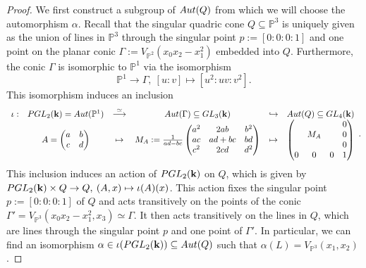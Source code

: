 \documentclass[10pt,a4paper]{amsart}
\newcommand{\Aut}{\textup{Aut}}
\newcommand{\GL}{\textup{GL}}
\newcommand{\PGL}{\textup{PGL}}
\newcommand{\Pone}{\mathbb{P}^1}
\newcommand{\Pthree}{\mathbb{P}^3}
\newcommand{\Ptwo}{\mathbb{P}^2}
\newcommand{\VPthree}{V_{\Pthree}}
\newcommand{\VPtwo}{V_{\Ptwo}}
\newcommand{\kk}{\mathbf{k}}
\newcommand{\sub}{\subseteq}
\begin{document}
\begin{proof}
We first construct a subgroup of $\Aut(Q)$ from which we will choose the automorphism $\alpha$. Recall that the singular quadric cone $Q\sub\Pthree$ is uniquely given as the union of lines in $\Pthree$ through the singular point $p:=[0:0:0:1]$ and one point on the planar conic $\Gamma:=\VPtwo(x_0x_2-x_1^2)$ embedded into $Q$. Furthermore, the conic $\Gamma$ is isomorphic to $\Pone$ via the isomorphism 
$$ \Pone \rightarrow \Gamma, \: [u:v]\mapsto [u^2:uv:v^2].$$
This isomorphism induces an inclusion
$$\begin{array}{c c c c c c}
\iota: &\PGL_2(\kk) = \Aut(\Pone) &\overset{\simeq}{\longrightarrow} &\Aut(\Gamma)\sub\GL_3(\kk) &\hookrightarrow &\Aut(Q)\sub \GL_4(\kk)\\
&A=\begin{pmatrix}
a & b\\
c & d
\end{pmatrix}
& \mapsto 
&M_A:=\frac{1}{ad-bc} \begin{pmatrix}
a^2 & 2ab & b^2\\
ac & ad+bc & bd\\
c^2 & 2cd & d^2
\end{pmatrix}
&\mapsto 
&\begin{pmatrix}
& & &0\\
& M_A& &0\\
& & &0\\
0&0&0&1
\end{pmatrix}
\end{array}. $$
This inclusion induces an action of $\PGL_2(\kk)$ on $Q$, which is given by $\PGL_2(\kk)\times Q \rightarrow Q, \: (A,x)\mapsto \iota(A)(x)$. This action fixes the singular point 
$p:=[0:0:0:1]$ of $Q$
and acts transitively on the points of the conic $\Gamma'=\VPthree(x_0x_2-x_1^2,x_3)\simeq \Gamma$. It then acts transitively on the lines in $Q$, which are lines through the singular point $p$ and one point of $\Gamma'$. In particular, we can find an isomorphism $\alpha \in \iota(\PGL_2(\kk))\sub \Aut(Q)$ such that $\alpha(L)=\VPthree(x_1,x_2)$.
\end{proof}
\end{document}
